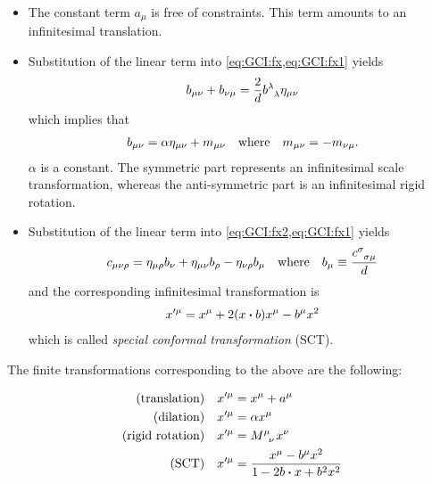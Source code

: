 \documentclass[10pt]{article}
\newenvironment{boxmath}[1]{\begin{tcolorbox}[enhanced,attach boxed title to top center={yshift=-\tcboxedtitleheight/2},boxrule=1pt,title={\centering #1},colframe=NavyBlue!70!black,colback=NavyBlue!10,colbacktitle=NavyBlue!10,fonttitle=\scshape,coltitle=Black]}{\end{tcolorbox}}
\begin{document}
\begin{itemize}
    \item The constant term $a_\mu$ is free of constraints.
    This term amounts to an infinitesimal translation.
    \item Substitution of the linear term into \cref{eq:GCI:fx,eq:GCI:fx1} yields 
          \begin{align}
            b_{\mu\nu}+b_{\nu\mu}=\frac{2}{d}\tensor{b}{^\lambda_\lambda}\eta_{\mu\nu}
          \end{align}
          which implies that 
          \begin{align}
            b_{\mu\nu}=\alpha\eta_{\mu\nu}+m_{\mu\nu}\qq{where}m_{\mu\nu}=-m_{\nu\mu}.
          \end{align}
          $\alpha$ is a constant.
          The symmetric part represents an infinitesimal scale transformation, whereas the anti-symmetric part is an infinitesimal rigid rotation.
    \item Substitution of the linear term into \cref{eq:GCI:fx2,eq:GCI:fx1} yields 
          \begin{align}
            c_{\mu\nu\rho}=\eta_{\mu\rho}b_{\nu}+\eta_{\mu\nu}b_{\rho}-\eta_{\nu\rho}b_{\mu}\qq{where}b_{\mu}\equiv\frac{\tensor{c}{^\sigma_\sigma_\mu}}{d}
          \end{align} 
          and the corresponding infinitesimal transformation is 
          \begin{align}
            x'^\mu=x^\mu+2(x\vdot b)x^\mu-b^\mu x^2
          \end{align}
          which is called \textit{special conformal transformation} (SCT).
\end{itemize}
The finite transformations corresponding to the above are the following:
\begin{boxmath}{Finite Conformal Transformation}
    \begin{align}
        \text{(translation)}&\quad x'^\mu=x^\mu+a^\mu\\
        \text{(dilation)}&\quad x'^\mu=\alpha x^\mu\\
        \text{(rigid rotation)}&\quad x'^\mu=\tensor{M}{^\mu_\nu}x^\nu\\
        \text{(SCT)}&\quad x'^\mu=\frac{x^\mu-b^\mu x^2}{1-2b\vdot x+b^2 x^2}
    \end{align}
\end{boxmath}
\end{document}
